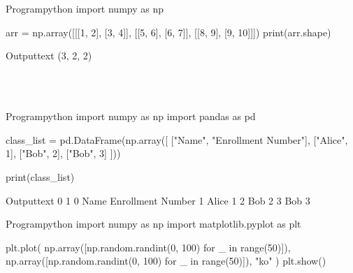 \documentclass[11pt]{ipu-python}
\begin{document}
    \\~\\
    \begin{code}
        {Program}{python}
import numpy as np

arr = np.array([[[1, 2], [3, 4]], [[5, 6], [6, 7]], [[8, 9], [9, 10]]])
print(arr.shape)
    \end{code}
    \begin{code}
        {Output}{text}
(3, 2, 2)
    \end{code}

    \\~\\
    \begin{code}
        {Program}{python}
import numpy as np
import pandas as pd

class_list = pd.DataFrame(np.array([
    ["Name", "Enrollment Number"],
    ["Alice", 1],
    ["Bob", 2],
    ["Bob", 3]
]))

print(class_list)
    \end{code}
    \begin{code}
        {Output}{text}
       0                  1
0   Name  Enrollment Number
1  Alice                  1
2    Bob                  2
3    Bob                  3
    \end{code}

    \newpage
    \begin{code}
        {Program}{python}
import numpy as np
import matplotlib.pyplot as plt

plt.plot(
    np.array([np.random.randint(0, 100) for _ in range(50)]),
    np.array([np.random.randint(0, 100) for _ in range(50)]),
    "ko"
)
plt.show()
    \end{code}
\end{document}
